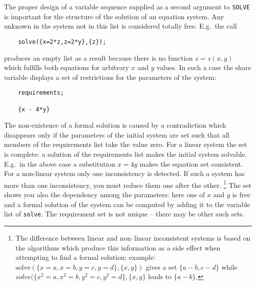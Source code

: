 The proper design of a variable sequence
supplied as a second argument to \texttt{SOLVE} is important
for the structure of the solution of an equation system.
Any unknown in the system
not in this list is considered totally free. E.g.\  the call
\begin{verbatim}
    solve({x=2*z,z=2*y},{z});
\end{verbatim}
produces an empty list as a result because there is no function
$z=z(x,y)$ which fulfills both equations for arbitrary $x$ and $y$ values.
\hypertarget{reserved:requirements}{}
In such a case the share variable 
displays a set of restrictions for the parameters of the system:
\begin{verbatim}
    requirements;

    {x - 4*y}
\end{verbatim}
The non-existence of a formal solution is caused by a
contradiction which disappears only if the parameters
of the initial system are set such that all members
of the requirements list take the value zero.
For a linear system the set is complete: a solution
of the requirements list makes the initial
system solvable. E.g.\  in the above case a substitution
$x=4y$ makes the equation set consistent. For a non-linear
system only one inconsistency is detected. If such a system
has more than one inconsistency, you must reduce them
one after the other.
\footnote{
The difference between linear and non--linear
inconsistent systems is based on the algorithms which
produce this information as a side effect when attempting
to find a formal solution; example:
$\mathrm{solve}(\{x=a,x=b,y=c,y=d\},\{x,y\})$ gives a set $\{a-b,c-d\}$
while $solve(\{x^2=a,x^2=b,y^2=c,y^2=d\},\{x,y\}$ leads to $\{a-b\}$.
}
The  set shows you also the dependency among the parameters: here
one of $x$ and $y$ is free and a formal solution of the system can be
computed by adding it to the variable list of \texttt{solve}.
The requirement set is not unique -- there may be other such sets.


